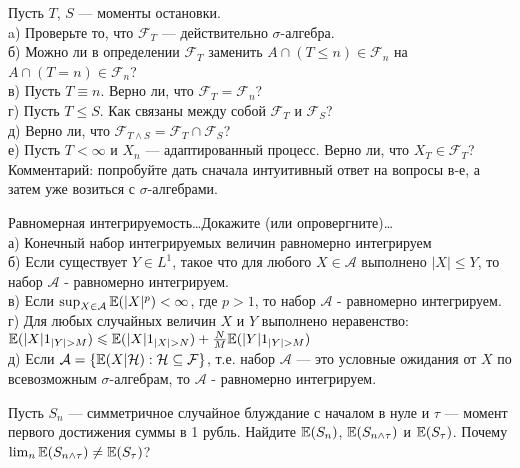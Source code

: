 \begin{solution}
\begin{solution}
\begin{solution}
\begin{solution}
\begin{solution}
\begin{solution}
\begin{solution}
\begin{solution}
\begin{solution}
{\begin{problem}
 Пусть $T$, $S$ --- моменты остановки. \\
a) Проверьте то, что $\mathcal{F}_{T}$ --- действительно
$\sigma$-алгебра. \\
б) Можно ли в определении $\mathcal{F}_{T}$ заменить $A\cap (T\le
n)\in \mathcal{F}_{n}$ на $A\cap (T=n)\in
\mathcal{F}_{n}$? \\
в) Пусть $T\equiv n$. Верно ли, что
$\mathcal{F}_{T}=\mathcal{F}_{n}$? \\
г) Пусть $T\le S$. Как связаны между собой $\mathcal{F}_{T}$ и
$\mathcal{F}_{S}$? \\
д) Верно ли, что $\mathcal{F}_{T\wedge S}=\mathcal{F}_{T}\cap
\mathcal{F}_{S}$? \\
е) Пусть $T<\infty$ и $X_{n}$ --- адаптированный процесс. Верно
ли, что $X_{T}\in \mathcal{F}_{T}$? \\
Комментарий: попробуйте дать сначала интуитивный ответ на вопросы
в-е, а затем уже возиться с $\sigma$-алгебрами. 
\end{problem} 
\begin{solution} 

\end{solution}

\begin{problem}
 Равномерная интегрируемость\ldots Докажите (или опровергните)\ldots \\
а) Конечный набор интегрируемых величин равномерно
интегрируем \\
б) Если существует $Y\in L^{1}$, такое что для любого $X\in
\mathcal{A}$ выполнено $|X|\le Y$, то набор $\mathcal{A}$ -
равномерно интегрируем. \\
в) Если $\sup_{X\in \mathcal{A}}\mathbb{E}(|X|^{p})<\infty$, где $p>1$, то
набор $\mathcal{A}$ -
равномерно интегрируем. \\
г) Для любых случайных величин $X$ и $Y$ выполнено неравенство:
$\E(|X|1_{|Y|>M})\le \E(|X|1_{|X|>N})+\frac{N}{M}\E(|Y|1_{|Y|>M})$ \\
д) Если $\mathcal{A}=\{\mathbb{E}(X|\mathcal{H}):\mathcal{H}\subseteq
\mathcal{F}\}$, т.е. набор $\mathcal{A}$ --- это условные ожидания
от $X$ по всевозможным $\sigma$-алгебрам, то $\mathcal{A}$ -
равномерно интегрируем. 
\end{problem} 
\begin{solution} 

\end{solution}

\begin{problem}
Пусть $S_{n}$ --- симметричное случайное блуждание с началом в
нуле и $\tau$ --- момент первого достижения суммы в 1 рубль. Найдите
$\mathbb{E}(S_{n})$, $\mathbb{E}(S_{n\wedge \tau})$ и $\mathbb{E}(S_{\tau})$. Почему
$\lim_{n}
\mathbb{E}(S_{n\wedge \tau})\neq \mathbb{E}(S_{\tau})$? 
\end{problem} 
\begin{solution} 


\end{solution}}
\end{solution}
\end{solution}
\end{solution}
\end{solution}
\end{solution}
\end{solution}
\end{solution}
\end{solution}
\end{solution}
